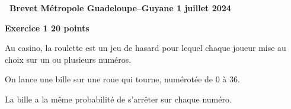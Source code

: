 \documentclass[11pt]{article}
\begin{document}
\hypertarget{Metropole}{}
\label{Metropole}
\pagestyle{fancy}
\thispagestyle{empty}
\begin{center} {\Large \textbf{\decofourleft~Brevet Métropole Guadeloupe--Guyane 1 juillet 2024 \decofourright}}
	\end{center}

\bigskip

{\large \textbf{Exercice 1 \hfill 20 points}}

\medskip

Au casino, la roulette est un jeu de hasard pour lequel chaque joueur mise au choix sur un ou plusieurs numéros.

On lance une bille sur une roue qui tourne, numérotée de 0 à 36.

La bille a la même probabilité de s’arrêter sur chaque numéro.
\end{document}
